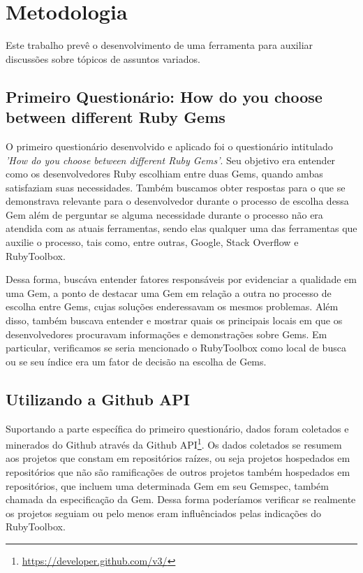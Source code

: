 \chapter{Metodologia}

Este trabalho prevê o desenvolvimento de uma ferramenta para auxiliar discussões sobre tópicos de assuntos variados.

\section{Primeiro Questionário: How do you choose between different Ruby Gems}

O primeiro questionário desenvolvido e aplicado foi o questionário intitulado \textit{'How do you choose between different Ruby Gems'}. Seu objetivo era entender como os desenvolvedores Ruby escolhiam entre duas Gems, quando ambas satisfaziam suas necessidades. Também buscamos obter respostas para o que se demonstrava relevante para o desenvolvedor durante o processo de escolha dessa Gem além de perguntar se alguma necessidade durante o processo não era atendida com as atuais ferramentas, sendo elas qualquer uma das ferramentas que auxilie o processo, tais como, entre outras, Google, Stack Overflow e RubyToolbox.

Dessa forma, buscáva entender fatores responsáveis por evidenciar a qualidade em uma Gem, a ponto de destacar uma Gem em relação a outra no processo de escolha entre Gems, cujas soluções enderessavam os mesmos problemas. Além disso, também buscava entender e mostrar quais os principais locais em que os desenvolvedores procuravam informações e demonstrações sobre Gems. Em particular, verificamos se seria mencionado o RubyToolbox como local de busca ou se seu índice era um fator de decisão na escolha de Gems.

\section{Utilizando a Github API}
Suportando a parte específica do primeiro questionário, dados foram coletados e minerados do Github através da Github API\footnote{\url{https://developer.github.com/v3/}}. Os dados coletados se resumem aos projetos que constam em repositórios raízes, ou seja projetos hospedados em repositórios que não são ramificações de outros projetos também hospedados em repositórios, que incluem uma determinada Gem em seu Gemspec, também chamada da especificação da Gem. Dessa forma poderíamos verificar se realmente os projetos seguiam ou pelo menos eram influênciados pelas indicações do RubyToolbox.

